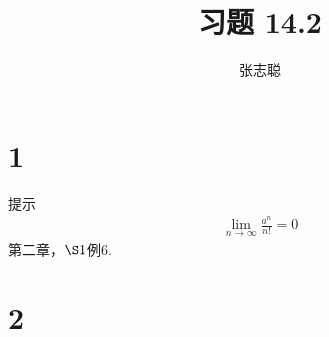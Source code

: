 \documentclass{article}
\begin{document}
\title{习题 14.2}
\author{张志聪}
\maketitle

\section*{1}

提示
\begin{align*}
  \lim\limits_{n \to \infty} \frac{a^n}{n!} = 0
\end{align*}
第二章，$\S 1$例6.

\section*{2}
\end{document}
